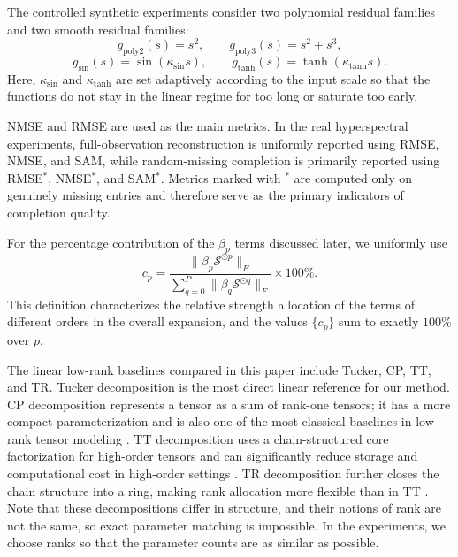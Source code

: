 The controlled synthetic experiments consider two polynomial residual families and two smooth residual families:
\begin{equation}
g_{\mathrm{poly2}}(s)=s^2,\qquad
g_{\mathrm{poly3}}(s)=s^2+s^3,
\end{equation}
\begin{equation}
g_{\sin}(s)=\sin(\kappa_{\sin}s),\qquad
g_{\tanh}(s)=\tanh(\kappa_{\tanh}s).
\end{equation}
Here, $\kappa_{\sin}$ and $\kappa_{\tanh}$ are set adaptively according to the input scale so that the functions do not stay in the linear regime for too long or saturate too early.

NMSE and RMSE are used as the main metrics. In the real hyperspectral experiments, full-observation reconstruction is uniformly reported using RMSE, NMSE, and SAM, while random-missing completion is primarily reported using RMSE$^\ast$, NMSE$^\ast$, and SAM$^\ast$. Metrics marked with $^\ast$ are computed only on genuinely missing entries and therefore serve as the primary indicators of completion quality.

For the percentage contribution of the $\beta_p$ terms discussed later, we uniformly use
\begin{equation}
c_p
=
\frac{\|\beta_p \mathcal S^{\odot p}\|_F}{\sum_{q=0}^{P}\|\beta_q \mathcal S^{\odot q}\|_F}\times 100\%.
\label{eq:beta-contribution}
\end{equation}
This definition characterizes the relative strength allocation of the terms of different orders in the overall expansion, and the values $\{c_p\}$ sum to exactly $100\%$ over $p$.

The linear low-rank baselines compared in this paper include Tucker, CP, TT, and TR. Tucker decomposition is the most direct linear reference for our method. CP decomposition represents a tensor as a sum of rank-one tensors; it has a more compact parameterization and is also one of the most classical baselines in low-rank tensor modeling \cite{Kolda2009Tensor}. TT decomposition uses a chain-structured core factorization for high-order tensors and can significantly reduce storage and computational cost in high-order settings \cite{oseledets2011}. TR decomposition further closes the chain structure into a ring, making rank allocation more flexible than in TT \cite{zhao2016tr}. Note that these decompositions differ in structure, and their notions of rank are not the same, so exact parameter matching is impossible. In the experiments, we choose ranks so that the parameter counts are as similar as possible.

